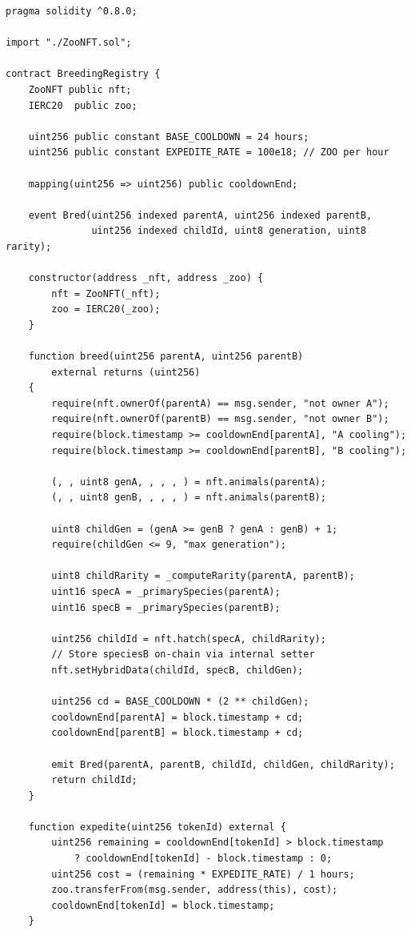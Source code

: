 \documentclass[11pt,letterpaper]{article}
\begin{document}
\begin{lstlisting}[language=Solidity,caption={BreedingRegistry: hybrid genetics and cool-downs}]
pragma solidity ^0.8.0;

import "./ZooNFT.sol";

contract BreedingRegistry {
    ZooNFT public nft;
    IERC20  public zoo;

    uint256 public constant BASE_COOLDOWN = 24 hours;
    uint256 public constant EXPEDITE_RATE = 100e18; // ZOO per hour

    mapping(uint256 => uint256) public cooldownEnd;

    event Bred(uint256 indexed parentA, uint256 indexed parentB,
               uint256 indexed childId, uint8 generation, uint8 rarity);

    constructor(address _nft, address _zoo) {
        nft = ZooNFT(_nft);
        zoo = IERC20(_zoo);
    }

    function breed(uint256 parentA, uint256 parentB)
        external returns (uint256)
    {
        require(nft.ownerOf(parentA) == msg.sender, "not owner A");
        require(nft.ownerOf(parentB) == msg.sender, "not owner B");
        require(block.timestamp >= cooldownEnd[parentA], "A cooling");
        require(block.timestamp >= cooldownEnd[parentB], "B cooling");

        (, , uint8 genA, , , , ) = nft.animals(parentA);
        (, , uint8 genB, , , , ) = nft.animals(parentB);

        uint8 childGen = (genA >= genB ? genA : genB) + 1;
        require(childGen <= 9, "max generation");

        uint8 childRarity = _computeRarity(parentA, parentB);
        uint16 specA = _primarySpecies(parentA);
        uint16 specB = _primarySpecies(parentB);

        uint256 childId = nft.hatch(specA, childRarity);
        // Store speciesB on-chain via internal setter
        nft.setHybridData(childId, specB, childGen);

        uint256 cd = BASE_COOLDOWN * (2 ** childGen);
        cooldownEnd[parentA] = block.timestamp + cd;
        cooldownEnd[parentB] = block.timestamp + cd;

        emit Bred(parentA, parentB, childId, childGen, childRarity);
        return childId;
    }

    function expedite(uint256 tokenId) external {
        uint256 remaining = cooldownEnd[tokenId] > block.timestamp
            ? cooldownEnd[tokenId] - block.timestamp : 0;
        uint256 cost = (remaining * EXPEDITE_RATE) / 1 hours;
        zoo.transferFrom(msg.sender, address(this), cost);
        cooldownEnd[tokenId] = block.timestamp;
    }


\end{lstlisting}
\end{document}
